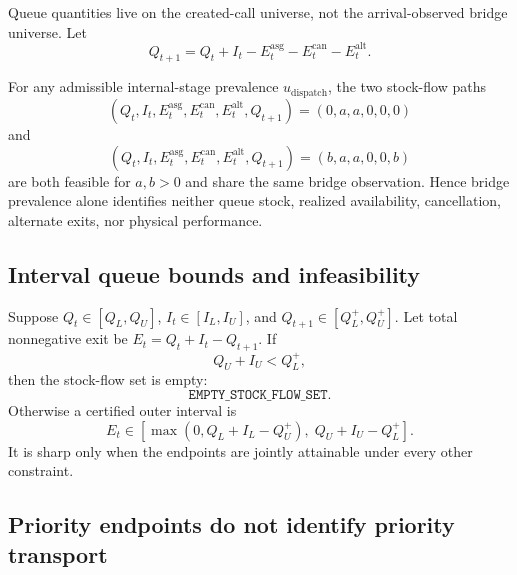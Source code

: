 \documentclass[11pt]{article}
\begin{document}
Queue quantities live on the created-call universe, not the arrival-observed bridge universe. Let
\begin{equation}
Q_{t+1}=Q_t+I_t-E^{\mathrm{asg}}_t-E^{\mathrm{can}}_t-E^{\mathrm{alt}}_t.
\label{eq:queuefull}
\end{equation}

\begin{plainbox}[title=Theorem 3: bridge information does not identify queue state]
For any admissible internal-stage prevalence $u_{\mathrm{dispatch}}$, the two stock-flow paths
\begin{equation}
(Q_t,I_t,E^{\mathrm{asg}}_t,E^{\mathrm{can}}_t,E^{\mathrm{alt}}_t,Q_{t+1})
=(0,a,a,0,0,0)
\end{equation}
and
\begin{equation}
(Q_t,I_t,E^{\mathrm{asg}}_t,E^{\mathrm{can}}_t,E^{\mathrm{alt}}_t,Q_{t+1})
=(b,a,a,0,0,b)
\end{equation}
are both feasible for $a,b>0$ and share the same bridge observation. Hence bridge prevalence alone identifies neither queue stock, realized availability, cancellation, alternate exits, nor physical performance.
\end{plainbox}

\subsection{Interval queue bounds and infeasibility}

Suppose $Q_t\in[Q_L,Q_U]$, $I_t\in[I_L,I_U]$, and $Q_{t+1}\in[Q^+_L,Q^+_U]$. Let total nonnegative exit be $E_t=Q_t+I_t-Q_{t+1}$. If
\begin{equation}
Q_U+I_U<Q^+_L,
\end{equation}
then the stock-flow set is empty:
\begin{equation}
\texttt{EMPTY\_STOCK\_FLOW\_SET}.
\end{equation}
Otherwise a certified outer interval is
\begin{equation}
E_t\in
\left[
\max(0,Q_L+I_L-Q^+_U),
\;Q_U+I_U-Q^+_L
\right].
\label{eq:queuebounds}
\end{equation}
It is sharp only when the endpoints are jointly attainable under every other constraint.

\subsection{Priority endpoints do not identify priority transport}
\end{document}
